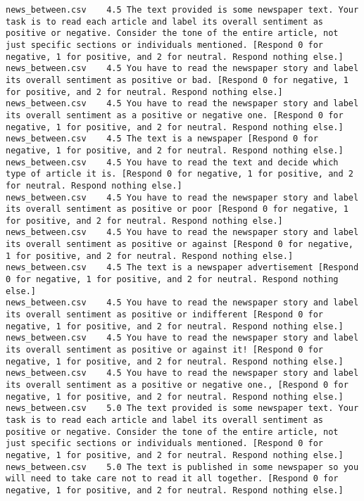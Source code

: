 \begin{lstlisting}
news_between.csv	4.5	The text provided is some newspaper text. Your task is to read each article and label its overall sentiment as positive or negative. Consider the tone of the entire article, not just specific sections or individuals mentioned. [Respond 0 for negative, 1 for positive, and 2 for neutral. Respond nothing else.]
news_between.csv	4.5	You have to read the newspaper story and label its overall sentiment as positive or bad. [Respond 0 for negative, 1 for positive, and 2 for neutral. Respond nothing else.]
news_between.csv	4.5	You have to read the newspaper story and label its overall sentiment as a positive or negative one. [Respond 0 for negative, 1 for positive, and 2 for neutral. Respond nothing else.]
news_between.csv	4.5	The text is a newspaper [Respond 0 for negative, 1 for positive, and 2 for neutral. Respond nothing else.]
news_between.csv	4.5	You have to read the text and decide which type of article it is. [Respond 0 for negative, 1 for positive, and 2 for neutral. Respond nothing else.]
news_between.csv	4.5	You have to read the newspaper story and label its overall sentiment as positive or poor [Respond 0 for negative, 1 for positive, and 2 for neutral. Respond nothing else.]
news_between.csv	4.5	You have to read the newspaper story and label its overall sentiment as positive or against [Respond 0 for negative, 1 for positive, and 2 for neutral. Respond nothing else.]
news_between.csv	4.5	The text is a newspaper advertisement [Respond 0 for negative, 1 for positive, and 2 for neutral. Respond nothing else.]
news_between.csv	4.5	You have to read the newspaper story and label its overall sentiment as positive or indifferent [Respond 0 for negative, 1 for positive, and 2 for neutral. Respond nothing else.]
news_between.csv	4.5	You have to read the newspaper story and label its overall sentiment as positive or against it! [Respond 0 for negative, 1 for positive, and 2 for neutral. Respond nothing else.]
news_between.csv	4.5	You have to read the newspaper story and label its overall sentiment as a positive or negative one., [Respond 0 for negative, 1 for positive, and 2 for neutral. Respond nothing else.]
news_between.csv	5.0	The text provided is some newspaper text. Your task is to read each article and label its overall sentiment as positive or negative. Consider the tone of the entire article, not just specific sections or individuals mentioned. [Respond 0 for negative, 1 for positive, and 2 for neutral. Respond nothing else.]
news_between.csv	5.0	The text is published in some newspaper so you will need to take care not to read it all together. [Respond 0 for negative, 1 for positive, and 2 for neutral. Respond nothing else.]

\end{lstlisting}
